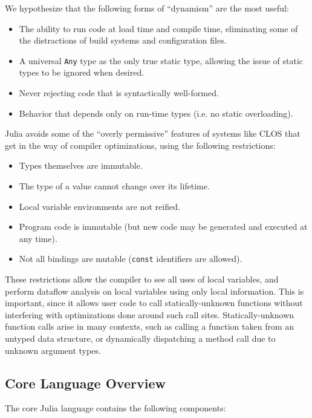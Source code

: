 \documentclass[9pt]{sigplanconf}
\begin{document}
We hypothesize that the following forms of ``dynamism'' are the most useful:

\begin{itemize}
\item The ability to run code at load time and compile time, eliminating
some of the distractions of build systems and configuration files.
\item A universal {\tt Any} type as the only true static type,
allowing the issue of static types to be ignored when desired.
\item Never rejecting code that is syntactically well-formed.
\item Behavior that depends only on run-time types (i.e. no static overloading).
\end{itemize}

Julia avoids some of the ``overly permissive'' features of systems like
CLOS \cite{clostrophobia} that get in the way of compiler optimizations,
using the following restrictions:

\begin{itemize}
\item Types themselves are immutable.
\item The type of a value cannot change over its lifetime.
\item Local variable environments are not reified.
\item Program code is immutable (but new code may be generated and executed at any time).
\item Not all bindings are mutable ({\tt const} identifiers are allowed).
\end{itemize}

These restrictions allow the compiler to see all uses of local
variables, and perform dataflow analysis on local variables using only
local information. This is important, since it allows user code to call
statically-unknown functions without interfering with optimizations done
around such call sites. Statically-unknown function calls arise in
many contexts, such as calling a function taken from an untyped data structure,
or dynamically dispatching a method call due to unknown argument types.

\subsection{Core Language Overview}

The core Julia language contains the following components:
\end{document}
